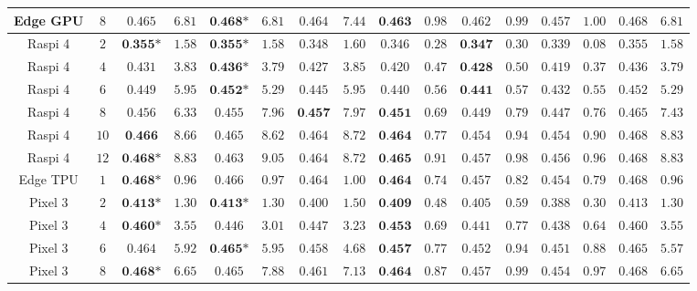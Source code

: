\documentclass[runningheads]{llncs}
\begin{document}
{\begin{table*}[t]
\begin{center}
\begin{scriptsize}
{\begin{tabular}{cc||cc|cc|cc||cc|cc|cc||cc}
Edge GPU & $8$ & $\textit{0.465}$ & $6.81$ & $\textbf{0.468*}$ & $6.81$ & $0.464$ & $7.44$ & $\textbf{0.463}$ & $0.98$ & $\textit{0.462}$ & $0.99$ & $0.457$ & $1.00$ & $0.468$ & $6.81$ \\
        \midrule
Raspi 4 & $2$ & $\textbf{0.355*}$ & $1.58$ & $\textbf{0.355*}$ & $1.58$ & $0.348$ & $1.60$ & $\textit{0.346}$ & $0.28$ & $\textbf{0.347}$ & $0.30$ & $0.339$ & $0.08$ & $0.355$ & $1.58$ \\
Raspi 4 & $4$ & $\textit{0.431}$ & $3.83$ & $\textbf{0.436*}$ & $3.79$ & $0.427$ & $3.85$ & $\textit{0.420}$ & $0.47$ & $\textbf{0.428}$ & $0.50$ & $0.419$ & $0.37$ & $0.436$ & $3.79$ \\
Raspi 4 & $6$ & $\textit{0.449}$ & $5.95$ & $\textbf{0.452*}$ & $5.29$ & $0.445$ & $5.95$ & $\textit{0.440}$ & $0.56$ & $\textbf{0.441}$ & $0.57$ & $0.432$ & $0.55$ & $0.452$ & $5.29$ \\
Raspi 4 & $8$ & $\textit{0.456}$ & $6.33$ & $0.455$ & $7.96$ & $\textbf{0.457}$ & $7.97$ & $\textbf{0.451}$ & $0.69$ & $\textit{0.449}$ & $0.79$ & $0.447$ & $0.76$ & $0.465$ & $7.43$ \\
Raspi 4 & $10$ & $\textbf{0.466}$ & $8.66$ & $\textit{0.465}$ & $8.62$ & $0.464$ & $8.72$ & $\textbf{0.464}$ & $0.77$ & $\textit{0.454}$ & $0.94$ & $\textit{0.454}$ & $0.90$ & $0.468$ & $8.83$ \\
Raspi 4 & $12$ & $\textbf{0.468*}$ & $8.83$ & $0.463$ & $9.05$ & $\textit{0.464}$ & $8.72$ & $\textbf{0.465}$ & $0.91$ & $\textit{0.457}$ & $0.98$ & $0.456$ & $0.96$ & $0.468$ & $8.83$ \\
        \midrule
Edge TPU & $1$ & $\textbf{0.468*}$ & $0.96$ & $\textit{0.466}$ & $0.97$ & $0.464$ & $1.00$ & $\textbf{0.464}$ & $0.74$ & $\textit{0.457}$ & $0.82$ & $0.454$ & $0.79$ & $0.468$ & $0.96$ \\
        \midrule
Pixel 3 & $2$ & $\textbf{0.413*}$ & $1.30$ & $\textbf{0.413*}$ & $1.30$ & $0.400$ & $1.50$ & $\textbf{0.409}$ & $0.48$ & $\textit{0.405}$ & $0.59$ & $0.388$ & $0.30$ & $0.413$ & $1.30$ \\
Pixel 3 & $4$ & $\textbf{0.460*}$ & $3.55$ & $0.446$ & $3.01$ & $\textit{0.447}$ & $3.23$ & $\textbf{0.453}$ & $0.69$ & $\textit{0.441}$ & $0.77$ & $0.438$ & $0.64$ & $0.460$ & $3.55$ \\
Pixel 3 & $6$ & $\textit{0.464}$ & $5.92$ & $\textbf{0.465*}$ & $5.95$ & $0.458$ & $4.68$ & $\textbf{0.457}$ & $0.77$ & $\textit{0.452}$ & $0.94$ & $0.451$ & $0.88$ & $0.465$ & $5.57$ \\
Pixel 3 & $8$ & $\textbf{0.468*}$ & $6.65$ & $\textit{0.465}$ & $7.88$ & $0.461$ & $7.13$ & $\textbf{0.464}$ & $0.87$ & $\textit{0.457}$ & $0.99$ & $0.454$ & $0.97$ & $0.468$ & $6.65$ \\

\end{tabular}}
\end{scriptsize}
\end{center}
\end{table*}}
\end{document}
